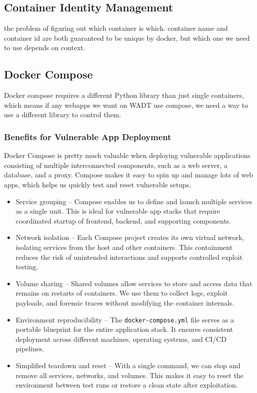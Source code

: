 \documentclass[12pt]{article}
\begin{document}
\subsection{Container Identity Management} \label{subsec:container-identity-management}
the problem of figuring out which container is which. container name and container id are both guaranteed to be unique by docker, but which one we need to use depends on context.

\subsection{Docker Compose}
Docker compose requires a different Python library than just
single containers, which means if any webapps we want on WADT
use compose, we need a way to use a different library to control them.

\subsubsection{Benefits for Vulnerable App Deployment}

Docker Compose is pretty much valuable when deploying vulnerable applications consisting of multiple interconnected components, such as a web server, a database, and a proxy. Compose makes it easy to spin up and manage lots of web apps, which helps us quickly test and reset vulnerable setups.

\begin{itemize}
    \item{Service grouping} – Compose enables us to define and launch multiple services as a single unit. This is ideal for vulnerable app stacks that require coordinated startup of frontend, backend, and supporting components.
    
    \item{Network isolation} – Each Compose project creates its own virtual network, isolating services from the host and other containers. This containment reduces the risk of unintended interactions and supports controlled exploit testing.
    
    \item{Volume sharing} – Shared volumes allow services to store and access data that remains on restarts of containers. We use them to collect logs, exploit payloads, and forensic traces without modifying the container internals.
    
    \item{Environment reproducibility} – The \texttt{docker-compose.yml} file serves as a portable blueprint for the entire application stack. It ensures consistent deployment across different machines, operating systems, and CI/CD pipelines.
    
    \item{Simplified teardown and reset} – With a single command, we can stop and remove all services, networks, and volumes. This makes it easy to reset the environment between test runs or restore a clean state after exploitation.
\end{itemize}
\end{document}
